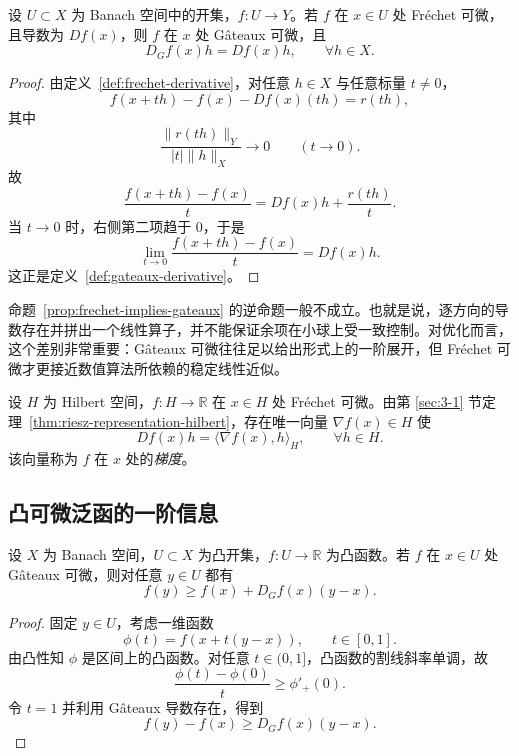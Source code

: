 \begin{proposition}\label{prop:frechet-implies-gateaux}
设 $U\subset X$ 为 Banach 空间中的开集，$f\colon U\to Y$。若 $f$ 在 $x\in U$ 处 Fréchet 可微，且导数为 $Df(x)$，则 $f$ 在 $x$ 处 Gâteaux 可微，且
\[
D_G f(x)h=Df(x)h,\qquad \forall h\in X.
\]
\end{proposition}

\begin{proof}
由定义~\ref{def:frechet-derivative}，对任意 $h\in X$ 与任意标量 $t\neq 0$，
\[
f(x+th)-f(x)-Df(x)(th)=r(th),
\]
其中
\[
\frac{\|r(th)\|_Y}{|t|\|h\|_X}\to 0\qquad (t\to 0).
\]
故
\[
\frac{f(x+th)-f(x)}{t}=Df(x)h+\frac{r(th)}{t}.
\]
当 $t\to 0$ 时，右侧第二项趋于 $0$，于是
\[
\lim_{t\to 0}\frac{f(x+th)-f(x)}{t}=Df(x)h.
\]
这正是定义~\ref{def:gateaux-derivative}。
\end{proof}

\begin{remark}
命题~\ref{prop:frechet-implies-gateaux} 的逆命题一般不成立。也就是说，逐方向的导数存在并拼出一个线性算子，并不能保证余项在小球上受一致控制。对优化而言，这个差别非常重要：Gâteaux 可微往往足以给出形式上的一阶展开，但 Fréchet 可微才更接近数值算法所依赖的稳定线性近似。
\end{remark}

\begin{definition}\label{def:hilbert-gradient}
设 $H$ 为 Hilbert 空间，$f\colon H\to \mathbb R$ 在 $x\in H$ 处 Fréchet 可微。由第 \ref{sec:3-1} 节定理~\ref{thm:riesz-representation-hilbert}，存在唯一向量 $\nabla f(x)\in H$ 使
\[
Df(x)h=\langle \nabla f(x),h\rangle_H,\qquad \forall h\in H.
\]
该向量称为 $f$ 在 $x$ 处的\emph{梯度}。
\end{definition}

\subsection{凸可微泛函的一阶信息}

\begin{proposition}[凸可微泛函的一阶支撑不等式]
设 $X$ 为 Banach 空间，$U\subset X$ 为凸开集，$f\colon U\to \mathbb R$ 为凸函数。若 $f$ 在 $x\in U$ 处 Gâteaux 可微，则对任意 $y\in U$ 都有
\[
f(y)\ge f(x)+D_Gf(x)(y-x).
\]
\end{proposition}

\begin{proof}
固定 $y\in U$，考虑一维函数
\[
\phi(t)=f(x+t(y-x)),\qquad t\in[0,1].
\]
由凸性知 $\phi$ 是区间上的凸函数。对任意 $t\in(0,1]$，凸函数的割线斜率单调，故
\[
\frac{\phi(t)-\phi(0)}{t}\ge \phi'_+(0).
\]
令 $t=1$ 并利用 Gâteaux 导数存在，得到
\[
f(y)-f(x)\ge D_Gf(x)(y-x).
\]
\end{proof}

